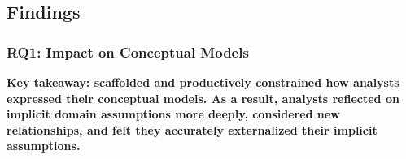 \begin{comment}

\subsubsection{\evalStatisticalModels}
We used AIC, BIC, and R-squared values to assess how well statistical models
authored with vs. without rTisane fit the data. We used rTisane to statistically
model and assess the influence of rTisane on AIC, BIC, and R-squared values.

We also thematically analyzed participants' reactions to the similarities,
differences, and surprises between statistical models. 

\end{comment}

\subsection{Findings}
\tableModelScores
\subsubsection{RQ1: \rTisanes Impact on Conceptual Models}
\conceptualModelsScaffold

\textbf{Key takeaway: \rTisane scaffolded and productively constrained how analysts expressed
their conceptual models. As a result, analysts reflected on implicit domain
assumptions more deeply, considered new relationships, and felt they
accurately externalized their implicit assumptions.}

